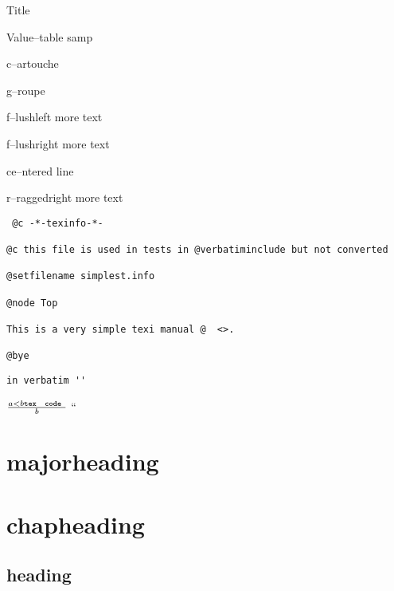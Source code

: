 \documentclass{book}
\newcommand\GNUTexinfotablestylesamp[1]{\ifstrempty{#1}{}{`\texttt{#1}'}}%
\newcommand{\GNUTexinfoplaceholder}[1]{}
\newcommand{\GNUTexinfonopagebreakheading}[2]{\let\clearpage\relax \let\cleardoublepage\relax \let\thispagestyle\GNUTexinfoplaceholder #1{#2}}
\begin{document}
\begin{description}[format=\GNUTexinfotablestylesamp]
\item[] Title
\item[a{-}{-}samp]
\item[a2{-}{-}samp]
Value--table samp
\end{description}

\begin{mdframed}[style=GNUTexinfocartouche]
c--artouche
\end{mdframed}

g--roupe

f--lushleft
more text

f--lushright
more text

\begin{center}
ce--ntered line
\end{center}

\begin{flushleft}
r--raggedright
more text
\end{flushleft}

\begin{verbatim}
 @c -*-texinfo-*-

@c this file is used in tests in @verbatiminclude but not converted

@setfilename simplest.info

@node Top

This is a very simple texi manual @  <>.

@bye
\end{verbatim}

\begin{verbatim}
in verbatim ''
\end{verbatim}





$\frac{a < b \texttt{tex \hbox{ code }}}{b}$ ``

\GNUTexinfonopagebreakheading{\chapter*}{majorheading}

\GNUTexinfonopagebreakheading{\chapter*}{chapheading}

\GNUTexinfonopagebreakheading{\section*}{heading}
\end{document}
